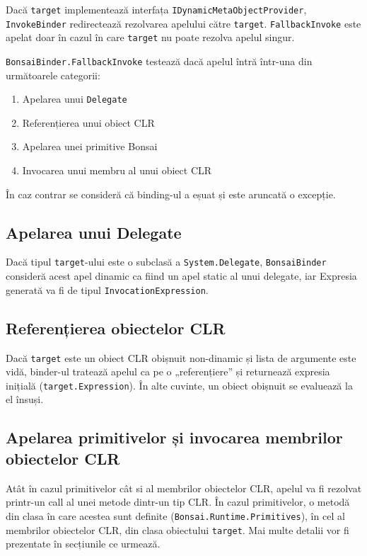\documentclass[12pt,a4paper]{memoir}
\renewcommand{\c}{\texttt}
\begin{document}
Dacă \c{target} implementează interfața \c{IDynamicMetaObjectProvider}, \\\c{InvokeBinder} redirectează rezolvarea apelului către \c{target}. \c{FallbackInvoke} este apelat doar în cazul în care \c{target} nu poate rezolva apelul singur.

\c{BonsaiBinder.FallbackInvoke} testează dacă apelul întră într-una din următoarele categorii:
\begin{enumerate}
\item Apelarea unui \c{Delegate}
\item Referențierea unui obiect CLR
\item Apelarea unei primitive Bonsai
\item Invocarea unui membru al unui obiect CLR
\end{enumerate}

În caz contrar se consideră că binding-ul a eșuat și este aruncată o excepție.

\subsection{Apelarea unui Delegate}

Dacă tipul \c{target}-ului este o subclasă a \c{System.Delegate}, \c{BonsaiBinder} consideră acest apel dinamic ca fiind un apel static al unui delegate, iar Expresia generată va fi de tipul \c{InvocationExpression}.

\subsection{Referențierea obiectelor CLR}

Dacă \c{target} este un obiect CLR obișnuit non-dinamic și lista de argumente este vidă, binder-ul tratează apelul ca pe o „referențiere” și returnează expresia inițială (\c{target.Expression}). În alte cuvinte, un obiect obișnuit se evaluează la el însuși.

\subsection{Apelarea primitivelor și invocarea membrilor obiectelor CLR}

Atât în cazul primitivelor cât si al membrilor obiectelor CLR, apelul va fi rezolvat printr-un call al unei metode dintr-un tip CLR. În cazul primitivelor, o metodă din clasa în care acestea sunt definite (\c{Bonsai.Runtime.Primitives}), în cel al membrilor obiectelor CLR, din clasa obiectului \c{target}. Mai multe detalii vor fi prezentate în secțiunile ce urmează.
\end{document}
